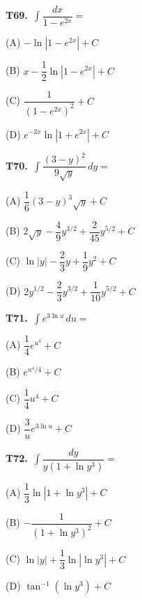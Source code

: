\documentclass[11pt]{article}
\begin{document}
\bigskip\noindent\textbf{T69.}\ $\displaystyle\int \dfrac{dx}{1-e^{2x}} =$
\begin{list}{}{\setlength{\leftmargin}{3em}\setlength{\labelwidth}{2.5em}\setlength{\itemsep}{0pt}\setlength{\topsep}{2pt}}
\item[(A)] $-\ln|1-e^{2x}|+C$
\item[(B)] $x-\dfrac{1}{2}\ln|1-e^{2x}|+C$
\item[(C)] $\dfrac{1}{(1-e^{2x})^2}+C$
\item[(D)] $e^{-2x}\ln|1+e^{2x}|+C$
\end{list}

\bigskip\noindent\textbf{T70.}\ $\displaystyle\int \dfrac{(3-y)^2}{9\sqrt{y}}\,dy =$
\begin{list}{}{\setlength{\leftmargin}{3em}\setlength{\labelwidth}{2.5em}\setlength{\itemsep}{0pt}\setlength{\topsep}{2pt}}
\item[(A)] $\dfrac{1}{6}(3-y)^3\sqrt{y}+C$
\item[(B)] $2\sqrt{y}-\dfrac{4}{9}y^{3/2}+\dfrac{2}{45}y^{5/2}+C$
\item[(C)] $\ln|y|-\dfrac{2}{3}y+\dfrac{1}{9}y^2+C$
\item[(D)] $2y^{1/2}-\dfrac{2}{3}y^{3/2}+\dfrac{1}{10}y^{5/2}+C$
\end{list}

\bigskip\noindent\textbf{T71.}\ $\displaystyle\int e^{3\ln u}\,du =$
\begin{list}{}{\setlength{\leftmargin}{3em}\setlength{\labelwidth}{2.5em}\setlength{\itemsep}{0pt}\setlength{\topsep}{2pt}}
\item[(A)] $\dfrac{1}{4}e^{u^4}+C$
\item[(B)] $e^{u^4/4}+C$
\item[(C)] $\dfrac{1}{4}u^4+C$
\item[(D)] $\dfrac{3}{u}e^{3\ln u}+C$
\end{list}

\bigskip\noindent\textbf{T72.}\ $\displaystyle\int \dfrac{dy}{y(1+\ln y^3)} =$
\begin{list}{}{\setlength{\leftmargin}{3em}\setlength{\labelwidth}{2.5em}\setlength{\itemsep}{0pt}\setlength{\topsep}{2pt}}
\item[(A)] $\dfrac{1}{3}\ln|1+\ln y^3|+C$
\item[(B)] $-\dfrac{1}{(1+\ln y^3)^2}+C$
\item[(C)] $\ln|y|+\dfrac{1}{3}\ln|\ln y^3|+C$
\item[(D)] $\tan^{-1}(\ln y^3)+C$
\end{list}
\end{document}
